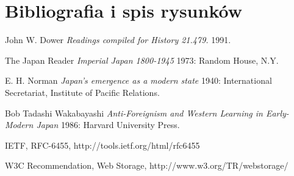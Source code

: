 \section{Bibliografia i spis rysunków}

\begin{thebibliography}{1}

 John W. Dower {\em Readings compiled for History
21.479.}  1991.

  The Japan Reader {\em Imperial Japan 1800-1945} 1973:
Random House, N.Y.

 E. H. Norman {\em Japan's emergence as a modern
state} 1940: International Secretariat, Institute of Pacific
Relations.

 Bob Tadashi Wakabayashi {\em Anti-Foreignism and Western
Learning in Early-Modern Japan} 1986: Harvard University Press.

 IETF, RFC-6455, http://tools.ietf.org/html/rfc6455

 W3C Recommendation, Web Storage, http://www.w3.org/TR/webstorage/

\end{thebibliography}
